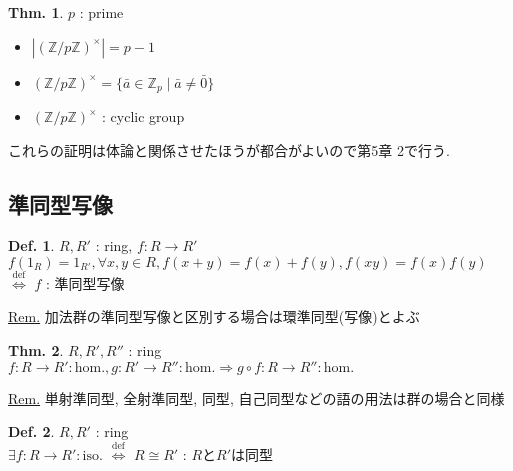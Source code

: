 \documentclass[uplatex,dvipdfmx,9pt]{beamer}
\newcommand{\defarrow}{\overset{\mathrm{def}}{\Leftrightarrow}}
\renewcommand{\hom}{\text{hom.}} %
\newcommand{\iso}{\text{iso.}} %
\newcommand{\Z}{\mathbb{Z}}
\newcommand{\sscount}{\textsection \thesubsection}
\newcounter{textExmCount}
\theoremstyle{definition} %
\newtheorem{defn}{Def.}[subsection] %
\newtheorem{thm}{Thm.}[subsection] %
\theoremstyle{example}
\begin{document}
    \begin{frame}
 
      \begin{thm}
        $p$ : prime
        \begin{itemize}
          \item $|(\Z / p\Z)^\times| = p - 1$
          \item $(\Z / p\Z)^\times = \{\bar{a} \in \Z_p \mid \bar{a} \neq \bar{0}\}$
          \item $(\Z / p\Z)^\times$ : cyclic group
        \end{itemize}
      \end{thm}
      これらの証明は体論と関係させたほうが都合がよいので第5章 \textsection 2で行う.
      
    \end{frame}

    \subsection{\sscount 準同型写像}
    \setcounter{textExmCount}{0}

    \begin{frame}

      \begin{defn}
        $R, R'$ : ring, $f\colon R \to R'$ \\
        $f(1_R) = 1_{R'}, \forall x, y \in R, f(x + y) = f(x) + f(y), f(xy) = f(x)f(y)$ $\defarrow$ $f$ : \alert{準同型写像}
      \end{defn}
      \underline{Rem.} 加法群の準同型写像と区別する場合は\alert{環準同型(写像)}とよぶ

      \begin{thm}
        $R, R', R''$ : ring \\
        $f\colon R \to R' : \hom, g\colon R' \to R'' : \hom \Rightarrow g \circ f \colon R \to R'' : \hom$
      \end{thm}
      \underline{Rem.} \alert{単射準同型}, \alert{全射準同型}, \alert{同型}, \alert{自己同型}などの語の用法は群の場合と同様

      \begin{defn}
        $R, R'$ : ring \\
        $\exists f\colon R \to R' : \iso$ $\defarrow$ $R \cong R'$ : $R$と$R'$は\alert{同型}
      \end{defn}
      
    \end{frame}
\end{document}
